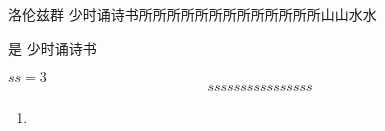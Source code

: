 \begin{definition}{洛伦兹群}
少时诵诗书所所所所所所所所所所所所所山山水水
\end{definition}
\begin{theorem}{是}
少时诵诗书
\end{theorem}
$ss=3$\begin{align}
ssssssssssssssss
\end{align}

\begin{enumerate}
\item \begin{example}{}

\end{example}
\end{enumerate}